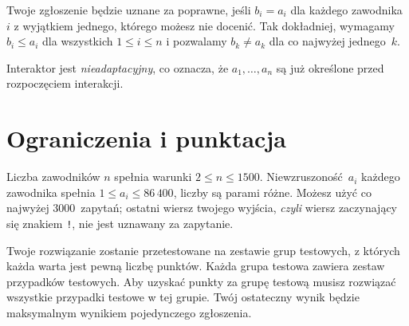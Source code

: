 Twoje zgłoszenie będzie uznane za poprawne, jeśli $b_i=a_i$ dla każdego zawodnika~$i$ z wyjątkiem jednego, którego możesz nie docenić.
Tak dokładniej, wymagamy $b_i\leq a_i$ dla wszystkich $1\leq i\leq n$ i pozwalamy $b_k \neq a_k$ dla co najwyżej jednego~$k$.

Interaktor jest \emph{nieadaptacyjny}, co oznacza, że $a_1,\ldots, a_n$ są już określone przed rozpoczęciem interakcji.

\section*{Ograniczenia i punktacja}

Liczba zawodników $n$ spełnia warunki 
$2\leq n\leq 1500$. %
Niewzruszoność~$a_i$ każdego zawodnika spełnia
$1\leq a_i\leq 86\,400$, %
liczby są parami różne. %
Możesz użyć
co najwyżej $3000$~zapytań; %
ostatni wiersz twojego wyjścia, \emph{czyli} wiersz zaczynający się znakiem \texttt{!}, nie jest uznawany za zapytanie.

Twoje rozwiązanie zostanie przetestowane na zestawie grup testowych, z których każda warta jest pewną liczbę punktów.
Każda grupa testowa zawiera zestaw przypadków testowych.
Aby uzyskać punkty za grupę testową musisz rozwiązać wszystkie przypadki testowe w tej grupie.
Twój ostateczny wynik będzie maksymalnym wynikiem pojedynczego zgłoszenia.

